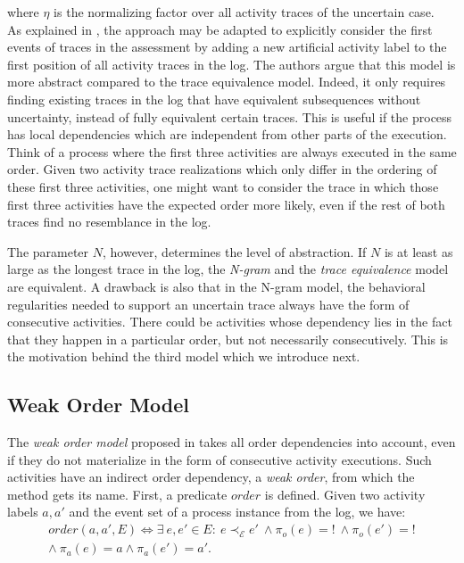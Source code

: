 where $\eta$ is the normalizing factor over all activity traces of the uncertain case.\\
As explained in \cite{por}, the approach may be adapted to explicitly consider the first events of traces in the assessment by adding a new artificial activity label to the first position of all activity traces in the log.
The authors argue that this model is more abstract compared to the trace equivalence model.
Indeed, it only requires finding existing traces in the log that have equivalent subsequences without uncertainty, instead of fully equivalent certain traces.
This is useful if the process has local dependencies which are independent from other parts of the execution.
Think of a process where the first three activities are always executed in the same order.
Given two activity trace realizations which only differ in the ordering of these first three activities, one might want to consider the trace in which those first three activities have the expected order more likely, even if the rest of both traces find no resemblance in the log.

The parameter $N$, however, determines the level of abstraction.
If $N$ is at least as large as the longest trace in the log, the \textit{N-gram} and the \textit{trace equivalence} model are equivalent.
A drawback is also that in the N-gram model, the behavioral regularities needed to support an uncertain trace always have the form of consecutive activities.
There could be activities whose dependency lies in the fact that they happen in a particular order, but not necessarily consecutively.
This is the motivation behind the third model which we introduce next.



\subsection{Weak Order Model}
The \textit{weak order model} proposed in \cite{por} takes all order dependencies into account, even if they do not materialize in the form of consecutive activity executions.
Such activities have an indirect order dependency, a \textit{weak order}, from which the method gets its name.
First, a predicate $order$ is defined.
Given two activity labels $a,a'$ and the event set of a process instance from the log, we have:
\begin{align*}
order(a,a',E) \Leftrightarrow 
\exists ~e, e' \in E: ~ e \prec_{\mathcal{E}} e' ~ \wedge \pi_o(e)=! ~ \wedge \pi_o(e')=! \\
\wedge ~ \pi_a(e)=a \wedge \pi_a(e')=a'.
\end{align*}

